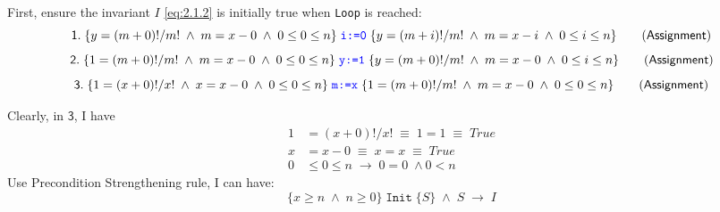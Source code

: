 First, ensure the invariant \(I\) \eqref{eq:2.1.2} is initially true when \texttt{Loop} is reached:
\begin{equation*}
  \mathsf{1.}\; \{y=(m+0)!/m!\;\land\;m=x-0\;\land\;0 \leq 0 \leq n\}\; \texttt{\textcolor{blue}{i:=0}}\; \{y=(m+i)!/m!\;\land\;m=x-i\;\land\;0 \leq i \leq n\} \tag{\(\mathsf{Assignment}\)}
\end{equation*}
\begin{equation*}
  \mathsf{2.}\; \{1=(m+0)!/m!\;\land\;m=x-0\;\land\;0 \leq 0 \leq n\}\; \texttt{\textcolor{blue}{y:=1}}\;\{y=(m+0)!/m!\;\land\;m=x-0\;\land\;0 \leq i \leq n\} \tag{\(\mathsf{Assignment}\)}
\end{equation*}
\begin{equation*}
\mathsf{3.}\; \{1=(x+0)!/x!\;\land\;x=x-0\;\land\;0 \leq 0 \leq n\}\;\texttt{\textcolor{blue}{m:=x}}\;\{1=(m+0)!/m!\;\land\;m=x-0\;\land\;0 \leq 0 \leq n\} \tag{\(\mathsf{Assignment}\)}
\end{equation*}


Clearly, in \(\mathsf{3}\), I have
\begin{align*}
  1& =(x+0)!/x!\; \equiv\; 1=1\;  \equiv\; True \\
  x& =x-0      \; \equiv\; x=x\;  \equiv\; True \\
  0& \leq 0 \leq n\; \rightarrow\; 0 = 0\;\land 0 < n
\end{align*}
Use Precondition Strengthening rule, I can have:
\begin{equation}
\label{eq:2.2.1}
\{x \geq n\;\wedge\; n \geq 0\}\; \texttt{Init}\; \{S\}\; \wedge\; S\; \rightarrow\; I
\end{equation}

